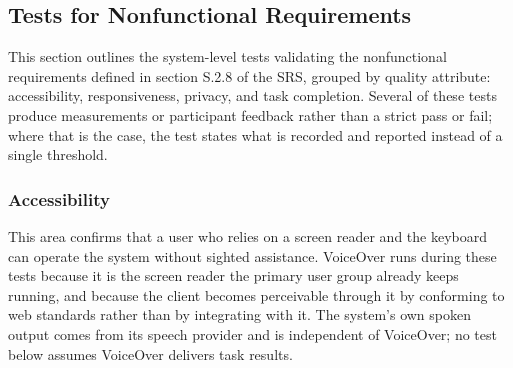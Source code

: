 \documentclass[12pt, titlepage]{article}
\begin{document}
\subsection{Tests for Nonfunctional Requirements}

This section outlines the system-level tests validating the nonfunctional requirements defined in section S.2.8
of the SRS, grouped by quality attribute: accessibility, responsiveness, privacy, and task completion. Several of
these tests produce measurements or participant feedback rather than a strict pass or fail; where that is the
case, the test states what is recorded and reported instead of a single threshold.

\subsubsection{Accessibility}

This area confirms that a user who relies on a screen reader and the keyboard can operate the system without
sighted assistance. VoiceOver runs during these tests because it is the screen reader the primary user group
already keeps running, and because the client becomes perceivable through it by conforming to web standards
rather than by integrating with it. The system's own spoken output comes from its speech provider and is
independent of VoiceOver; no test below assumes VoiceOver delivers task results.
\end{document}
